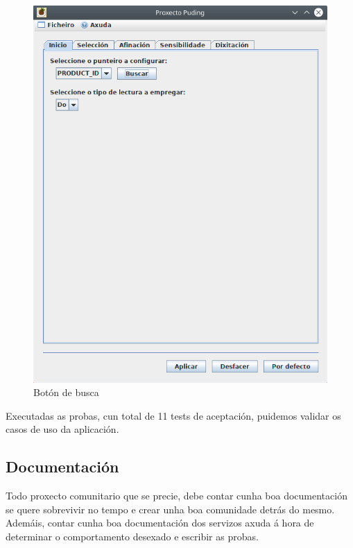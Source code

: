  \begin{figure}[htbp]
  \centering
  \includegraphics[scale=0.6,keepaspectratio=true]{./imagenes/boton-busca.png}
  \caption{Botón de busca}
  \label{figura:BotonBusca}
 \end{figure}
 
 Executadas as probas, cun total de 11 tests de aceptación, puidemos validar os
 casos de uso da aplicación.
 
 \subsection{Documentación}
 
 Todo proxecto comunitario que se precie, debe contar cunha boa documentación se
 quere sobrevivir no tempo e crear unha boa comunidade detrás do mesmo. \\
 
 Ademáis, contar cunha boa documentación dos servizos axuda á hora de determinar
 o comportamento desexado e escribir as probas. \\
 
